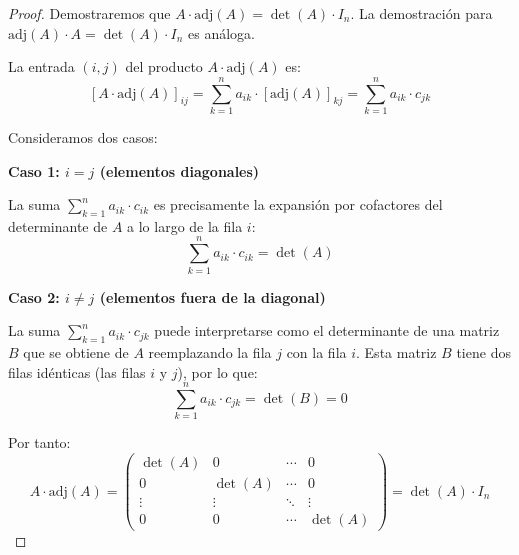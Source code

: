\begin{proof}
Demostraremos que $A \cdot \text{adj}(A) = \det(A) \cdot I_n$. La demostración para $\text{adj}(A) \cdot A = \det(A) \cdot I_n$ es análoga.

La entrada $(i,j)$ del producto $A \cdot \text{adj}(A)$ es:
\[
[A \cdot \text{adj}(A)]_{ij} = \sum_{k=1}^n a_{ik} \cdot [\text{adj}(A)]_{kj} = \sum_{k=1}^n a_{ik} \cdot c_{jk}
\]

Consideramos dos casos:

\textbf{Caso 1: $i = j$ (elementos diagonales)}

La suma $\sum_{k=1}^n a_{ik} \cdot c_{ik}$ es precisamente la expansión por cofactores del determinante de $A$ a lo largo de la fila $i$:
\[
\sum_{k=1}^n a_{ik} \cdot c_{ik} = \det(A)
\]

\textbf{Caso 2: $i \neq j$ (elementos fuera de la diagonal)}

La suma $\sum_{k=1}^n a_{ik} \cdot c_{jk}$ puede interpretarse como el determinante de una matriz $B$ que se obtiene de $A$ reemplazando la fila $j$ con la fila $i$. Esta matriz $B$ tiene dos filas idénticas (las filas $i$ y $j$), por lo que:
\[
\sum_{k=1}^n a_{ik} \cdot c_{jk} = \det(B) = 0
\]

Por tanto:
\[
A \cdot \text{adj}(A) = \begin{pmatrix}
\det(A) & 0 & \cdots & 0 \\
0 & \det(A) & \cdots & 0 \\
\vdots & \vdots & \ddots & \vdots \\
0 & 0 & \cdots & \det(A)
\end{pmatrix} = \det(A) \cdot I_n
\]
\end{proof}


